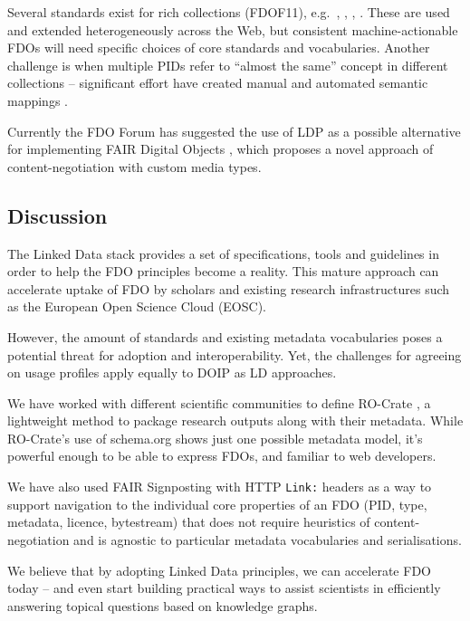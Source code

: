 Several standards exist for rich collections (FDOF11),
e.g.~,
,
,
. These are used and extended
heterogeneously across the Web, but consistent machine-actionable FDOs
will need specific choices of core standards and vocabularies. Another
challenge is when multiple PIDs refer to ``almost the same'' concept in
different collections -- significant effort have created manual and
automated semantic mappings \cite{Baker 2013,de Mello 2022}.

Currently the FDO Forum has suggested the use of LDP as a possible
alternative for implementing FAIR Digital Objects \cite{Bonino 2020}, which
proposes a novel approach of content-negotiation with custom media
types.

\subsection{Discussion}\label{ch2:discussion}

The Linked Data stack provides a set of specifications, tools and
guidelines in order to help the FDO principles become a reality. This
mature approach can accelerate uptake of FDO by scholars and existing
research infrastructures such as the European Open Science Cloud (EOSC).

However, the amount of standards and existing metadata vocabularies
poses a potential threat for adoption and interoperability. Yet, the
challenges for agreeing on usage profiles apply equally to DOIP as LD
approaches.

We have worked with different scientific communities to define 
RO-Crate \cite{Soiland-Reyes 2022a}, a
lightweight method to package research outputs along with their
metadata. While RO-Crate's use of schema.org shows just one possible
metadata model, it's powerful enough to be able to express FDOs, and
familiar to web developers.

We have also used FAIR \gls{Signposting} \cite{Van de Sompel 2022} with HTTP
\texttt{Link:} headers as a way to support navigation to the individual
core properties of an FDO (PID, type, metadata, licence, bytestream)
that does not require heuristics of content-negotiation and is agnostic
to particular metadata vocabularies and serialisations.

We believe that by adopting Linked Data principles, we can accelerate
FDO today -- and even start building practical ways to assist scientists
in efficiently answering topical questions based on knowledge graphs.

